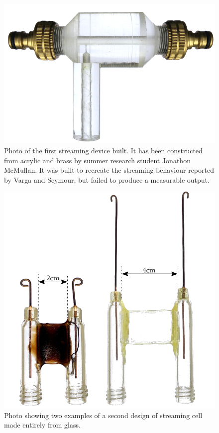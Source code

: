     \begin{figure}
      \centering
      \includegraphics[scale=0.9]{content/pt1/01-PowerHarvesting/graphics/StreamingCell_v0}
      \caption{\label{fig:first_cell}Photo of the first streaming device built. It has been constructed from acrylic and brass by summer research student Jonathon McMullan. It was built to recreate the streaming behaviour reported by Varga and Seymour, but failed to produce a measurable output.}
    \end{figure}
    \begin{figure}
      \centering
      \includegraphics[scale=0.7]{content/pt1/01-PowerHarvesting/graphics/StreamingCells_v1}
      \caption{\label{fig:first_cells}Photo showing two examples of a second design of streaming cell made entirely from glass.}
    \end{figure}

